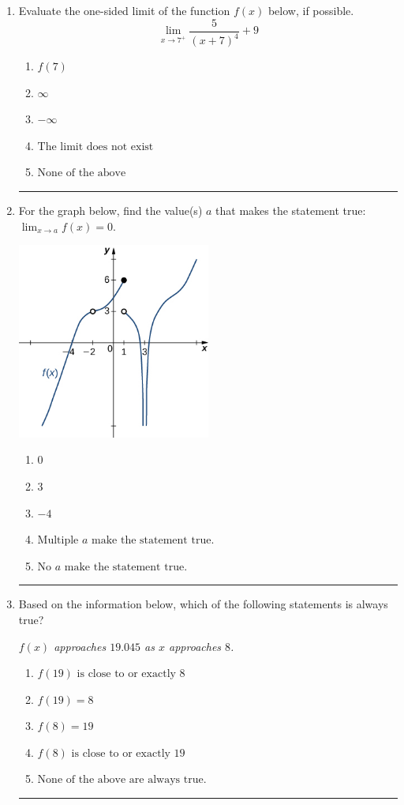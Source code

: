 \documentclass[14pt]{extbook}
\newcommand{\litem}[1]{\item#1\hspace*{-1cm}\rule{\textwidth}{0.4pt}}
\begin{document}
\begin{enumerate}
{\begin{enumerate}[label=\Alph*.]
\end{enumerate} }
\litem{
Evaluate the one-sided limit of the function $f(x)$ below, if possible.\[ \lim_{x \rightarrow 7^+} \frac{5}{(x+7)^4}+9 \]\begin{enumerate}[label=\Alph*.]
\item \( f(7) \)
\item \( \infty \)
\item \( -\infty \)
\item \( \text{The limit does not exist} \)
\item \( \text{None of the above} \)

\end{enumerate} }
\litem{
For the graph below, find the value(s) $a$ that makes the statement true: $ \displaystyle \lim_{x \rightarrow a} f(x) = 0$.
\begin{center}
    \includegraphics[width=0.5\textwidth]{../Figures/evaluateLimitGraphicallyCopyB.png}
\end{center}
\begin{enumerate}[label=\Alph*.]
\item \( 0 \)
\item \( 3 \)
\item \( -4 \)
\item \( \text{Multiple } a \text{ make the statement true}. \)
\item \( \text{No } a \text{ make the statement true}. \)

\end{enumerate} }
\litem{
Based on the information below, which of the following statements is always true?
\begin{center}
    \textit{ $f(x)$ approaches $19.045$ as $x$ approaches $8$. }
\end{center}
\begin{enumerate}[label=\Alph*.]
\item \( f(19) \text{ is close to or exactly } 8 \)
\item \( f(19) = 8 \)
\item \( f(8) = 19 \)
\item \( f(8) \text{ is close to or exactly } 19 \)
\item \( \text{None of the above are always true.} \)


\end{enumerate}}
\end{enumerate}
\end{document}
